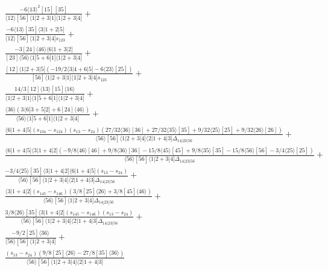 \documentclass[varwidth, border=5pt]{standalone}
\begin{document}
\begin{my}
$\begin{gathered}
\scriptscriptstyle\frac{-6⟨13⟩^2[15][35]}{⟨12⟩[56]⟨1|2+3|1]⟨1|2+3|4]}+\\
\scriptscriptstyle\frac{-6⟨13⟩[35]⟨3|1+2|5]}{⟨12⟩[56]⟨1|2+3|4]s_{123}}+\\
\scriptscriptstyle\frac{-3[24]⟨46⟩⟨6|1+3|2]}{[23]⟨56⟩⟨1|5+6|1]⟨1|2+3|4]}+\\
\scriptscriptstyle\frac{[12]⟨1|2+3|5](-19/2⟨3|4+6|5]-6⟨23⟩[25])}{[56]⟨1|2+3|1]⟨1|2+3|4]s_{123}}+\\
\scriptscriptstyle\frac{14/3[12]⟨13⟩[15]⟨16⟩}{⟨1|2+3|1]⟨1|5+6|1]⟨1|2+3|4]}+\\
\scriptscriptstyle\frac{⟨36⟩(3⟨6|3+5|2]+6[24]⟨46⟩)}{⟨56⟩⟨1|5+6|1]⟨1|2+3|4]}+\\
\scriptscriptstyle\frac{⟨6|1+4|5](s_{134}-s_{124})(s_{13}-s_{24})(27/32⟨36⟩[36]+27/32⟨35⟩[35]+9/32⟨25⟩[25]+9/32⟨26⟩[26])}{⟨56⟩[56]⟨1|2+3|4]⟨2|1+4|3]Δ_{14|23|56}}+\\
\scriptscriptstyle\frac{⟨6|1+4|5]⟨3|1+4|2](-9/8⟨46⟩[46]+9/8⟨36⟩[36]-15/8⟨45⟩[45]+9/8⟨35⟩[35]-15/8⟨56⟩[56]-3/4⟨25⟩[25])}{⟨56⟩[56]⟨1|2+3|4]Δ_{14|23|56}}+\\
\scriptscriptstyle\frac{-3/4⟨25⟩[35]⟨3|1+4|2]⟨6|1+4|5](s_{13}-s_{24})}{⟨56⟩[56]⟨1|2+3|4]⟨2|1+4|3]Δ_{14|23|56}}+\\
\scriptscriptstyle\frac{⟨3|1+4|2](s_{145}-s_{146})(3/8[25]⟨26⟩+3/8[45]⟨46⟩)}{⟨56⟩[56]⟨1|2+3|4]Δ_{14|23|56}}+\\
\scriptscriptstyle\frac{3/8⟨26⟩[35]⟨3|1+4|2](s_{145}-s_{146})(s_{13}-s_{24})}{⟨56⟩[56]⟨1|2+3|4]⟨2|1+4|3]Δ_{14|23|56}}+\\
\scriptscriptstyle\frac{-9/2[25]⟨36⟩}{⟨56⟩[56]⟨1|2+3|4]}+\\
\scriptscriptstyle\frac{(s_{13}-s_{24})(9/8[25]⟨26⟩-27/8[35]⟨36⟩)}{⟨56⟩[56]⟨1|2+3|4]⟨2|1+4|3]}\phantom{+}
\end{gathered}$
\end{my}
\end{document}
